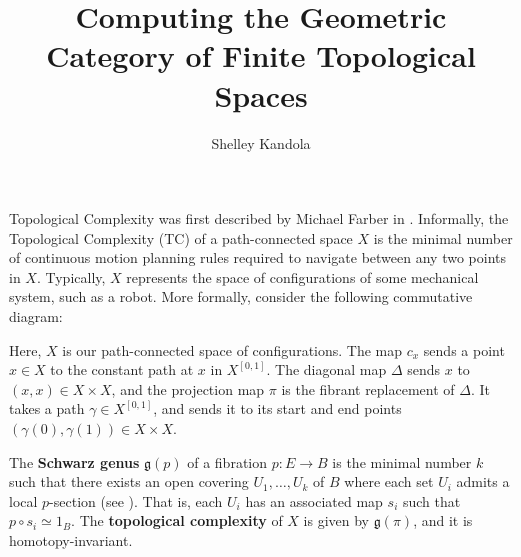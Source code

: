 \documentclass{article}
\title{Computing the Geometric Category of Finite Topological Spaces}
\author{Shelley Kandola}
\begin{document}
\maketitle


Topological Complexity was first described by Michael Farber in \cite{Farber2001}.
Informally, the Topological Complexity (TC) of a path-connected space $X$ is the minimal number of continuous motion planning rules required to navigate between any two points in $X$. Typically, $X$ represents the space of configurations of some mechanical system, such as a robot.
More formally, consider the following commutative diagram:

\begin{center}
\end{center}


Here, $X$ is our path-connected space of configurations.
The map $c_x$ sends a point $x\in X$ to the constant path at $x$ in $X^{[0,1]}$.
The diagonal map $\Delta$ sends $x$ to $(x,x)\in X \times X$, and the projection map $\pi$ is the fibrant replacement of $\Delta$.
It takes a path $\gamma \in X^{[0,1]}$, and sends it to its start and end points $(\gamma(0),\gamma(1)) \in X \times X$.

The {\bf Schwarz genus} $\mathfrak{g}(p)$ of a fibration $p:E \to B$ is the minimal number $k$ such that there exists an open covering $U_1,\hdots,U_k$ of $B$ where each set $U_i$ admits a local $p$-section (see \cite{Schwarz1958}).
That is, each $U_i$ has an associated map $s_i$ such that $p \circ s_i \simeq 1_B$. The \textbf{topological complexity} of $X$ is given by $\mathfrak{g}(\pi)$, and it is homotopy-invariant.
\end{document}

